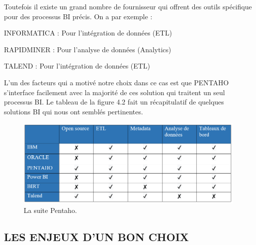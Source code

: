 Toutefois il existe un grand nombre de fournisseur qui offrent des outils spécifique pour des processus BI précis. On a par exemple : 
\begin{list}{•}{ }
   \item INFORMATICA : Pour l’intégration de données (ETL)
   \item RAPIDMINER : Pour l’analyse de données (Analytics)
   \item TALEND : Pour l’intégration de données (ETL)\\
\end{list}

L’un des facteurs qui a motivé notre choix dans ce cas est que PENTAHO s’interface facilement avec la majorité de ces solution qui traitent un seul processus BI. Le tableau de la figure 4.2 fait un récapitulatif de quelques solutions BI qui nous ont semblés pertinentes.\\

\begin{figure}[!htbp]
	\begin{center}
		\includegraphics[scale=0.55]{images/compare_bi_vendors_2.png}
		\caption{La suite Pentaho.}
		\label{bi_tools_compare}
	\end{center}
\end{figure}


\subsection{LES ENJEUX D’UN BON CHOIX}

